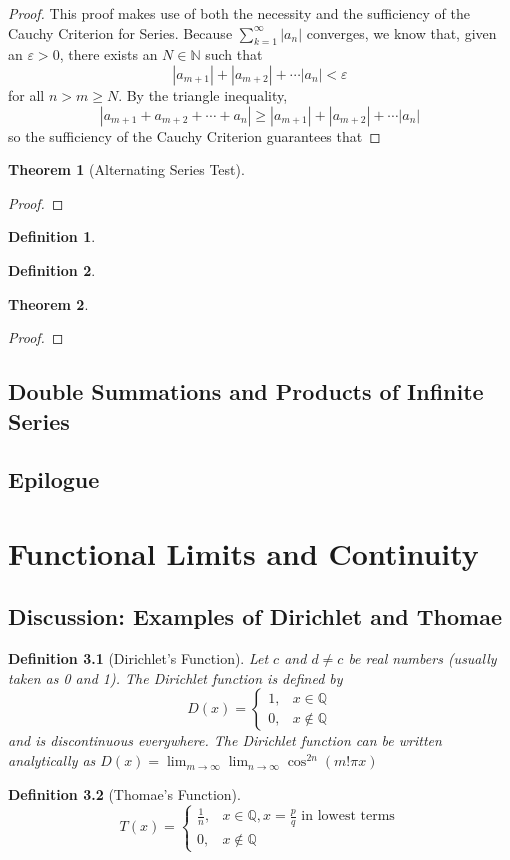 \documentclass[10pt]{report}
\newtheorem{thm2}{Theorem}[section]
\newtheorem{def2}{Definition}[section]
\newcommand{\eps}{\varepsilon}
\begin{document}
\begin{proof}
This proof makes use of both the necessity and the sufficiency of the Cauchy Criterion for Series. Because $\sum_{k=1}^\infty |a_n|$ converges, we know that, given an $\eps>0$, there exists an $N\in\mathbb{N}$ such that
$$|a_{m+1}| + |a_{m+2}| + \cdots |a_n|<\eps$$
for all $n>m\geq N$. By the triangle inequality,
$$|a_{m+1} + a_{m+2} + \cdots + a_n|\geq |a_{m+1}| + |a_{m+2}| + \cdots |a_n|$$
so the sufficiency of the Cauchy Criterion guarantees that 
\end{proof}
\begin{thm2}[Alternating Series Test]
\end{thm2}
\begin{proof}

\end{proof}
\begin{def2}
\end{def2}
\begin{def2}
\end{def2}
\begin{thm2}
\end{thm2}
\begin{proof}

\end{proof}
\section{Double Summations and Products of Infinite Series}
\section{Epilogue}

\chapter{Functional Limits and Continuity}
\section{Discussion: Examples of Dirichlet and Thomae}
\begin{def2}[Dirichlet's Function]
Let $c$ and $d\neq c$ be real numbers (usually taken as 0 and 1). The Dirichlet function is defined by
$$D(x) = \begin{cases} 1, & x\in\mathbb{Q}\\
0, & x\notin\mathbb{Q}
\end{cases}$$
and is discontinuous everywhere. The Dirichlet function can be written analytically as $D(x) = \lim_{m\to\infty}\lim_{n\to\infty}\cos^{2n}(m!\pi x)$
\end{def2}
\begin{def2}[Thomae's Function]
$$T(x) = \begin{cases} \frac{1}{n}, & x\in\mathbb{Q}, x=\frac{p}{q} \text{ in lowest terms}\\
0, & x\notin\mathbb{Q}
\end{cases}$$
\end{def2}
\end{document}

